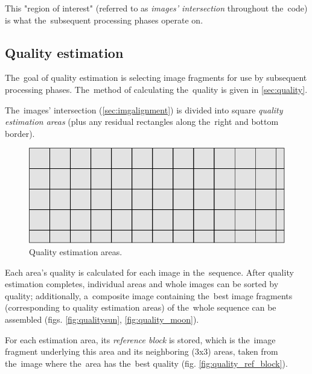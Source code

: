 \documentclass[12pt]{article}
\begin{document}
This "region of interest" (referred to as \emph{images' intersection} throughout the~code) is what the~subsequent
processing phases operate on.

\subsection{Quality estimation}\label{sec:quality_estimation}

The~goal of quality estimation is selecting image fragments for use by subsequent processing phases. The~method of
calculating the~quality is given in \ref{sec:quality}.

The~images' intersection (\ref{sec:imgalignment}) is divided into square \emph{quality estimation areas} (plus any
residual rectangles along the~right and bottom border).

\begin{figure}[H]
\centering
\includegraphics{quality_estimation_areas.pdf}
\caption{Quality estimation areas.}
\end{figure}

Each area's quality is calculated for each image in the~sequence. After quality estimation completes, individual areas
and whole images can be sorted by quality; additionally, a~composite image containing the~best image fragments
(corresponding to quality estimation areas) of the~whole sequence can be assembled (figs. \ref{fig:qualitysun},
\ref{fig:quality_moon}).

For each estimation area, its \emph{reference block} is stored, which is the~image fragment underlying this area and its
neighboring (3x3) areas, taken from the~image where the~area has the~best quality (fig. \ref{fig:quality_ref_block}).
\end{document}
